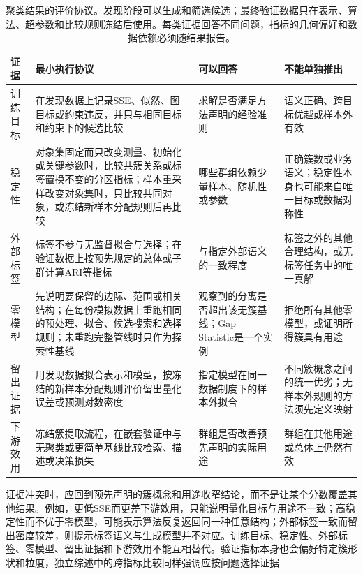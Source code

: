 \begin{table}[htbp]
  \centering
  \small
  \begin{tabularx}{\linewidth}{@{}>{\RaggedRight\arraybackslash}p{21mm}>{\RaggedRight\arraybackslash}p{43mm}>{\RaggedRight\arraybackslash}X>{\RaggedRight\arraybackslash}X@{}}
    \toprule
    证据 & 最小执行协议 & 可以回答 & 不能单独推出 \\
    \midrule
    训练目标 & 在发现数据上记录SSE、似然、图目标或约束违反，并只与相同目标和约束下的候选比较 & 求解是否满足方法声明的经验准则 & 语义正确、跨目标优越或样本外有效 \\
    稳定性 & 对象集固定而只改变测量、初始化或关键参数时，比较共簇关系或标签置换不变的分区指标；样本重采样改变对象集时，只比较共同对象，或冻结新样本分配规则后再比较 & 哪些群组依赖少量样本、随机性或参数 & 正确簇数或业务语义；稳定性本身也可能来自唯一目标或数据对称性 \\
    外部标签 & 标签不参与无监督拟合与选择；在验证数据上按预先规定的总体或子群计算ARI等指标 & 与指定外部语义的一致程度 & 标签之外的其他合理结构，或无标签任务中的唯一真解 \\
    零模型 & 先说明要保留的边际、范围或相关结构；在每份模拟数据上重跑相同的预处理、拟合、候选搜索和选择规则；未重跑完整管线时只作为探索性基线 & 观察到的分离是否超出该无簇基线；Gap Statistic是一个实例 & 拒绝所有其他零模型，或证明所得簇具有用途 \\
    留出证据 & 用发现数据拟合表示和模型，按冻结的新样本分配规则评价留出量化误差或预测对数密度 & 指定模型在同一数据制度下的样本外拟合 & 不同簇概念之间的统一优劣；无样本外规则的方法须先定义映射 \\
    下游效用 & 冻结簇提取流程，在嵌套验证中与无聚类或更简单基线比较检索、描述或决策损失 & 群组是否改善预先声明的实际用途 & 群组在其他用途或总体上仍然有效 \\
    \bottomrule
  \end{tabularx}
  \caption{聚类结果的评价协议。发现阶段可以生成和筛选候选；最终验证数据只在表示、算法、超参数和比较规则冻结后使用。每类证据回答不同问题，指标的几何偏好和数据依赖必须随结果报告。}
  \label{tab:clustering-evaluation-protocol}
\end{table}

证据冲突时，应回到预先声明的簇概念和用途收窄结论，而不是让某个分数覆盖其他结果。例如，更低SSE而更差下游效用，只能说明量化目标与用途不一致；高稳定性而不优于零模型，可能表示算法反复返回同一种任意结构；外部标签一致而留出密度较差，则提示标签语义与生成模型并不对应。训练目标、稳定性、外部标签、零模型、留出证据和下游效用不能互相替代。验证指标本身也会偏好特定簇形状和粒度，独立综述中的跨指标比较同样强调应按问题选择证据


